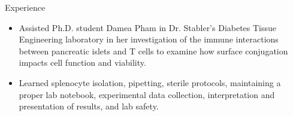 \documentclass{resume} %
\begin{document}
\begin{workSection}{Experience}
    \experienceItem[
        company=J. Crayton Pruitt Family Department of Biomedical Engineering,
        position=Undergraduate Research Internship Program,
        duration=May 2023 – July 2023
    ]
     \begin{itemize}
        \itemsep -6pt {} 
        \item  Assisted Ph.D. student Damea Pham in Dr. Stabler’s Diabetes Tissue Engineering laboratory in her investigation of the immune interactions between pancreatic islets and T cells to examine how surface conjugation impacts cell function and viability.
        \item Learned splenocyte isolation, pipetting, sterile protocols, maintaining a proper lab notebook, experimental data collection, interpretation and presentation of results, and lab safety.
     \end{itemize}
     
     
\end{workSection}
\end{document}
